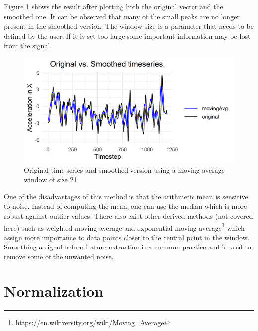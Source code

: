 \documentclass[
  11pt,
]{krantz}
\begin{document}
Figure \ref{fig:smoothingExample} shows the result after plotting both the original vector and the smoothed one. It can be observed that many of the small peaks are no longer present in the smoothed version. The window size is a parameter that needs to be defined by the user. If it is set too large some important information may be lost from the signal.

\begin{figure}

{\centering \includegraphics[width=1\linewidth]{images/smoothingExample} 

}

\caption{Original time series and smoothed version using a moving average window of size 21.}\label{fig:smoothingExample}
\end{figure}

One of the disadvantages of this method is that the arithmetic mean is sensitive to noise. Instead of computing the mean, one can use the median which is more robust against outlier values. There also exist other derived methods (not covered here) such as weighted moving average and exponential moving average\footnote{\url{https://en.wikiversity.org/wiki/Moving_Average}} which assign more importance to data points closer to the central point in the window. Smoothing a signal before feature extraction is a common practice and is used to remove some of the unwanted noise.

\hypertarget{normalization}{%
\section{Normalization}\label{normalization}}
\end{document}
